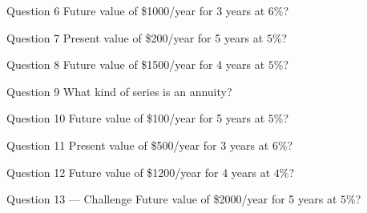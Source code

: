 \documentclass[11pt]{article}
\begin{document}
\begin{qbox}{Question 6}
Future value of \$1000/year for 3 years at $6\%$?\workspace{2.4cm}
\end{qbox}

\begin{qbox}{Question 7}
Present value of \$200/year for 5 years at $5\%$?\workspace{2.4cm}
\end{qbox}

\begin{qbox}{Question 8}
Future value of \$1500/year for 4 years at $5\%$?\workspace{2.4cm}
\end{qbox}

\begin{qbox}{Question 9}
What kind of series is an annuity?\workspace{2.4cm}
\end{qbox}

\begin{qbox}{Question 10}
Future value of \$100/year for 5 years at $5\%$?\workspace{2.4cm}
\end{qbox}

\begin{qbox}{Question 11}
Present value of \$500/year for 3 years at $6\%$?\workspace{2.4cm}
\end{qbox}

\begin{qbox}{Question 12}
Future value of \$1200/year for 4 years at $4\%$?\workspace{2.4cm}
\end{qbox}

\begin{qbox}{Question 13 --- Challenge}
Future value of \$2000/year for 5 years at $5\%$?\workspace{3cm}
\end{qbox}

\clearpage
{}
\end{document}
